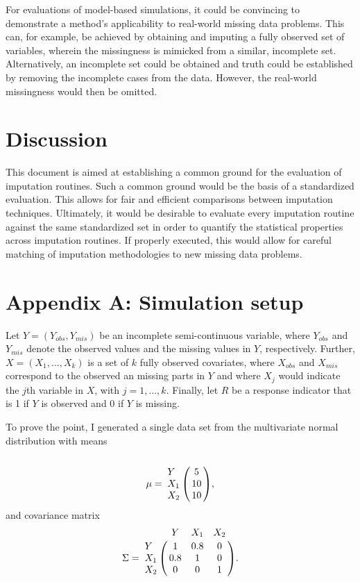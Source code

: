 \documentclass[
]{article}
\begin{document}
For evaluations of model-based simulations, it could be convincing to
demonstrate a method's applicability to real-world missing data
problems. This can, for example, be achieved by obtaining and imputing a
fully observed set of variables, wherein the missingness is mimicked
from a similar, incomplete set. Alternatively, an incomplete set could
be obtained and truth could be established by removing the incomplete
cases from the data. However, the real-world missingness would then be
omitted.

\hypertarget{discussion}{%
\section{Discussion}\label{discussion}}

This document is aimed at establishing a common ground for the
evaluation of imputation routines. Such a common ground would be the
basis of a standardized evaluation. This allows for fair and efficient
comparisons between imputation techniques. Ultimately, it would be
desirable to evaluate every imputation routine against the same
standardized set in order to quantify the statistical properties across
imputation routines. If properly executed, this would allow for careful
matching of imputation methodologies to new missing data problems.

\hypertarget{appendix-a-simulation-setup}{%
\section{Appendix A: Simulation
setup}\label{appendix-a-simulation-setup}}

Let \(Y=(Y_{obs},Y_{mis})\) be an incomplete semi-continuous variable,
where \(Y_{obs}\) and \(Y_{mis}\) denote the observed values and the
missing values in \(Y\), respectively. Further, \(X=(X_1,...,X_k)\) is a
set of \(k\) fully observed covariates, where \(X_{obs}\) and
\(X_{mis}\) correspond to the observed an missing parts in \(Y\) and
where \(X_j\) would indicate the \(j\)th variable in \(X\), with
\(j=1,\dots, k\). Finally, let \(R\) be a response indicator that is 1
if \(Y\) is observed and 0 if \(Y\) is missing.

To prove the point, I generated a single data set from the multivariate
normal distribution with means \[
\mu= \bordermatrix{&     \cr
 Y  &5  \cr
{ X}_1  &10 \cr
{ X}_2  &10 },
\] and covariance matrix \[
\Sigma = \bordermatrix{& Y &{ X}_1 &{ X}_2   \cr
 Y  &1  &0.8    &0\cr
{ X}_1  &0.8    &1  &0\cr
{ X}_2  &0  &0  &1}.
\]
\end{document}

